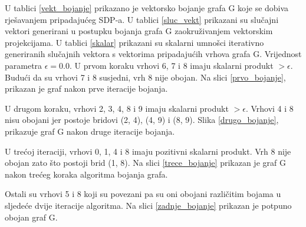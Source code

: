 \documentclass[diplomskirad]{fer}
\begin{document}
U tablici \ref{vekt_bojanje} prikazano je vektorsko bojanje grafa G koje se dobiva rješavanjem pripadajućeg SDP-a.
U tablici \ref{sluc_vekt} prikazani su slučajni vektori generirani u postupku bojanja grafa G zaokruživanjem vektorskim projekcijama.
U tablici \ref{skalar} prikazani su skalarni umnošci iterativno generiranih slučajnih vektora s vektorima pripadajućih vrhova grafa G.
Vrijednost parametra $\epsilon = 0.0$. U prvom koraku vrhovi 6, 7 i 8 imaju skalarni produkt $>\epsilon$. Budući da su vrhovi 7 i 8 susjedni, 
vrh 8 nije obojan. Na slici \ref{prvo_bojanje}, prikazan je graf nakon prve iteracije bojanja.

U drugom koraku, vrhovi 2, 3, 4, 8 i 9 imaju skalarni produkt $>\epsilon$. Vrhovi 4 i 8 nisu obojani jer postoje bridovi (2, 4), (4, 9) i (8, 9).
Slika \ref{drugo_bojanje}, prikazuje graf G nakon druge iteracije bojanja.

U trećoj iteraciji, vrhovi 0, 1, 4 i 8 imaju pozitivni skalarni produkt. Vrh 8 nije obojan zato što postoji brid (1, 8). Na slici \ref{trece_bojanje}
prikazan je graf G nakon trećeg koraka algoritma bojanja grafa.

Ostali su vrhovi 5 i 8 koji su povezani pa su oni obojani različitim bojama u sljedeće dvije iteracije algoritma. Na slici \ref{zadnje_bojanje}
prikazan je potpuno obojan graf G.
\end{document}
